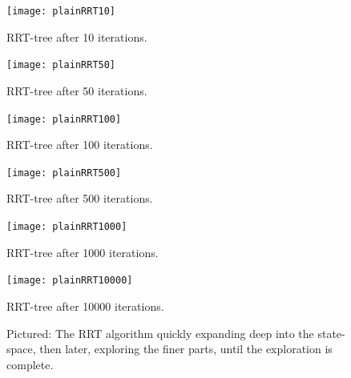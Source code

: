 \begin{figure}
  \centering 
\end{figure}

\begin{figure}
  \centering
  \begin{minipage}[b]{0.3\textwidth}
    \texttt{[image: plainRRT10]}
    \caption{RRT-tree after 10 iterations.}
  \end{minipage}
  \begin{minipage}[b]{0.3\textwidth}
    \texttt{[image: plainRRT50]}
    \caption{RRT-tree after 50 iterations.}
  \end{minipage}
  \begin{minipage}[b]{0.3\textwidth}
    \texttt{[image: plainRRT100]}
    \caption{RRT-tree after 100 iterations.}
  \end{minipage}
  \newline %
  \begin{minipage}[b]{0.3\textwidth}
    \texttt{[image: plainRRT500]}
    \caption{RRT-tree after 500 iterations.}
  \end{minipage}
  \begin{minipage}[b]{0.3\textwidth}
    \texttt{[image: plainRRT1000]}
    \caption{RRT-tree after 1000 iterations.}
  \end{minipage}
  \begin{minipage}[b]{0.3\textwidth}
    \texttt{[image: plainRRT10000]}
    \caption{RRT-tree after 10000 iterations.}
  \end{minipage}
  \caption{Pictured: The \ac{RRT} algorithm quickly expanding deep into the
    state-space, then later, exploring the finer parts, until the exploration is
    complete.}
  \label{fig:rrt-expansion}
\end{figure}


